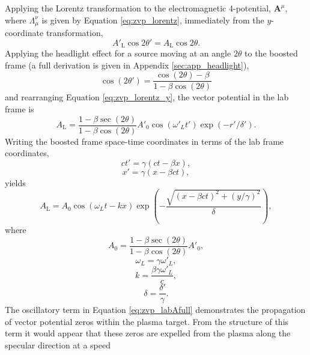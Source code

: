 Applying the Lorentz transformation to the electromagnetic 4-potential, $\mathbf{A}^\mu$, where $\Lambda_\mu^\nu$ is given by Equation \ref{eq:zvp_lorentz}, immediately from the $y$-coordinate transformation,
\begin{equation}\label{eq:zvp_lorentz_y}
	A'_\mathrm{L}\cos{2\theta'} = A_\mathrm{L}\cos{2\theta}.
\end{equation}
Applying the headlight effect for a source moving at an angle $2\theta$ to the boosted frame (a full derivation is given in Appendix \ref{sec:app_headlight}),
\begin{equation}
	\cos{(2\theta')} = \frac{\cos{(2\theta)}-\beta}{1 - \beta\cos{(2\theta)}}
\end{equation}
and rearranging Equation \ref{eq:zvp_lorentz_y}, the vector potential in the lab frame is
\begin{equation}\label{eq:zvp_labA}
	A_\mathrm{L} = \frac{1-\beta \sec{(2\theta)}}{1 - \beta\cos{(2\theta)}} A'_0\cos{(\omega'_L t')}\exp{(-r'/\delta')}.
\end{equation}
Writing the boosted frame space-time coordinates in terms of the lab frame coordinates,
\begin{equation}
	ct' = \gamma(ct-\beta x),
\end{equation}
\begin{equation}
	x' = \gamma(x-\beta ct),
\end{equation}
yields
\begin{equation}\label{eq:zvp_labAfull}
	A_\mathrm{L} =  A_0\cos{(\omega_L t - kx)}\exp{\left(-\frac{\sqrt{(x-\beta ct)^2+(y/\gamma)^2}}{\delta}\right)},
\end{equation}
where
\begin{equation}
	A_0 = \frac{1-\beta \sec{(2\theta)}}{1 - \beta\cos{(2\theta)}}A'_0,
\end{equation}
\begin{equation}
	\omega_L = \gamma \omega'_L,
\end{equation}
\begin{equation}
	k = \frac{\beta \gamma\omega'_L}{c},
\end{equation}
\begin{equation}
	\delta = \frac{\delta'}{\gamma}.
\end{equation}
The oscillatory term in Equation \ref{eq:zvp_labAfull} demonstrates the propagation of vector potential zeros within the plasma target. From the structure of this term it would appear that these zeros are expelled from the plasma along the specular direction at a speed

